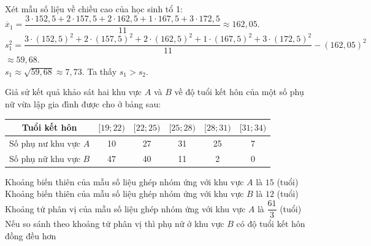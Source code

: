 \begin{ex}
{\begin{itemchoice}
			Xét mẫu số liệu về chiều cao của học sinh tổ 1:\\
			$\overline{x}_1=\dfrac{3\cdot 152{,}5+2\cdot 157{,}5+2\cdot 162{,}5+1\cdot 167{,}5+3\cdot 172{,}5}{11} \approx 162{,}05$.\\
			$s_1^2=\dfrac{3\cdot(152{,}5)^2+2\cdot(157{,}5)^2+2\cdot(162{,}5)^2+1\cdot(167{,}5)^2+3\cdot(172{,}5)^2}{11}-(162{,}05)^2$\\ $\approx 59{,}68$.\\
			$s_1\approx \sqrt{59{,}68}\approx 7{,}73$. Ta thấy $s_1>s_2$.
		\end{itemchoice}
	}
\end{ex}

\begin{ex}%
	Giả sử kết quả khảo sát hai khu vực $A$ và $B$ về độ tuổi kết hôn của một số phụ nữ vừa lập gia đình được cho ở bảng sau:
	\begin{center}
		\begin{tabular}{|c|c|c|c|c|c|}
			\hline
			Tuổi kết hôn & {$[19; 22)$} & {$[22; 25)$} & {$[25; 28)$} & {$[28; 31)$} & {$[31; 34)$} \\
			\hline
			Số phụ nư khu vực $A$ & 10 & 27 & 31 & 25 & 7 \\
			\hline
			Số phụ nữ khu vực $B$ & 47 & 40 & 11 & 2 & 0 \\
			\hline
		\end{tabular}
	\end{center}
	\choiceTF
	{\True Khoảng biến thiên của mẫu số liệu ghép nhóm ứng với khu vực $A$ là $15$ (tuổi)}
	{\True Khoảng biến thiên của mẫu số liệu ghép nhóm ứng với khu vực $B$ là $12$ (tuổi)}
	{Khoảng tứ phân vị của mẫu số liệu ghép nhóm ứng với khu vực $A$ là $\dfrac{61}{3}$ (tuổi)}
	{\True Nếu so sánh theo khoảng tứ phân vị thì phụ nữ ở khu vực $B$ có độ tuổi kết hôn đồng đều hơn}
\end{ex}
